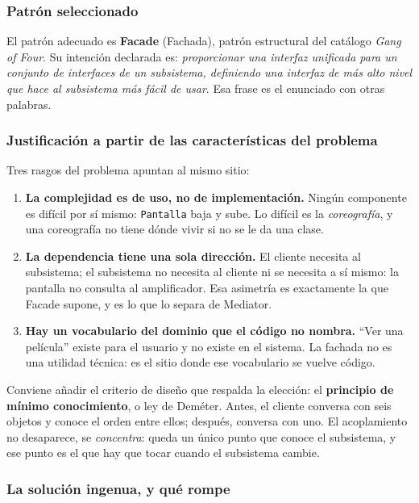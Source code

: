 \subsubsection*{Patrón seleccionado}

El patrón adecuado es \textbf{Facade} (Fachada), patrón estructural del catálogo
\textit{Gang of Four}. Su intención declarada es: \textit{proporcionar una interfaz unificada
para un conjunto de interfaces de un subsistema, definiendo una interfaz de más alto nivel que
hace al subsistema más fácil de usar}. Esa frase es el enunciado con otras palabras.

\subsubsection*{Justificación a partir de las características del problema}

Tres rasgos del problema apuntan al mismo sitio:

\begin{enumerate}[leftmargin=1.2cm]
    \item \textbf{La complejidad es de uso, no de implementación.} Ningún componente es
          difícil por sí mismo: \texttt{Pantalla} baja y sube. Lo difícil es la
          \emph{coreografía}, y una coreografía no tiene dónde vivir si no se le da una
          clase.
    \item \textbf{La dependencia tiene una sola dirección.} El cliente necesita al
          subsistema; el subsistema no necesita al cliente ni se necesita a sí mismo: la
          pantalla no consulta al amplificador. Esa asimetría es exactamente la que Facade
          supone, y es lo que lo separa de Mediator.
    \item \textbf{Hay un vocabulario del dominio que el código no nombra.} ``Ver una
          película'' existe para el usuario y no existe en el sistema. La fachada no es una
          utilidad técnica: es el sitio donde ese vocabulario se vuelve código.
\end{enumerate}

Conviene añadir el criterio de diseño que respalda la elección: el
\textbf{principio de mínimo conocimiento}, o ley de Deméter. Antes, el cliente conversa con
seis objetos y conoce el orden entre ellos; después, conversa con uno. El acoplamiento no
desaparece, se \emph{concentra}: queda un único punto que conoce el subsistema, y ese punto
es el que hay que tocar cuando el subsistema cambie.

\subsubsection*{La solución ingenua, y qué rompe}

